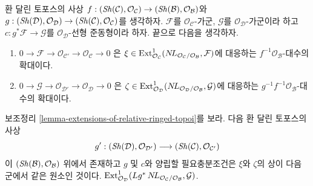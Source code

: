 \begin{lemma}
\label{lemma-extensions-of-relative-ringed-topoi-functorial}
환 달린 토포스의 사상
$f : (\mathop{\mathit{Sh}}\nolimits(\mathcal{C}), \mathcal{O}_\mathcal{C}) \to
(\mathop{\mathit{Sh}}\nolimits(\mathcal{B}), \mathcal{O}_\mathcal{B})$와
$g : (\mathop{\mathit{Sh}}\nolimits(\mathcal{D}), \mathcal{O}_\mathcal{D}) \to
(\mathop{\mathit{Sh}}\nolimits(\mathcal{C}), \mathcal{O}_\mathcal{C})$를 생각하자. $\mathcal{F}$를
$\mathcal{O}_\mathcal{C}$-가군, $\mathcal{G}$를
$\mathcal{O}_\mathcal{D}$-가군이라 하고
$c : g^*\mathcal{F} \to \mathcal{G}$를 $\mathcal{O}_\mathcal{D}$-선형
준동형이라 하자. 끝으로 다음을 생각하자.
\begin{enumerate}
\item[(a)]
$0 \to \mathcal{F} \to \mathcal{O}_{\mathcal{C}'} \to
\mathcal{O}_\mathcal{C} \to 0$
은
$\xi \in \mathop{\mathrm{Ext}}\nolimits^1_{\mathcal{O}_\mathcal{C}}(
\mathop{N\!L}\nolimits_{\mathcal{O}_\mathcal{C}/\mathcal{O}_\mathcal{B}}, \mathcal{F})$에
대응하는 $f^{-1}\mathcal{O}_\mathcal{B}$-대수의 확대이다.
\item[(b)]
$0 \to \mathcal{G} \to \mathcal{O}_{\mathcal{D}'} \to
\mathcal{O}_\mathcal{D} \to 0$
은
$\zeta \in \mathop{\mathrm{Ext}}\nolimits^1_{\mathcal{O}_\mathcal{D}}(
\mathop{N\!L}\nolimits_{\mathcal{O}_\mathcal{D}/\mathcal{O}_\mathcal{B}}, \mathcal{G})$에
대응하는 $g^{-1}f^{-1}\mathcal{O}_\mathcal{B}$-대수의 확대이다.
\end{enumerate}
보조정리 \ref{lemma-extensions-of-relative-ringed-topoi}를 보라. 다음
환 달린 토포스의 사상
$$
g' :
(\mathop{\mathit{Sh}}\nolimits(\mathcal{D}), \mathcal{O}_{\mathcal{D}'})
\longrightarrow
(\mathop{\mathit{Sh}}\nolimits(\mathcal{C}), \mathcal{O}_{\mathcal{C}'})
$$
이 $(\mathop{\mathit{Sh}}\nolimits(\mathcal{B}), \mathcal{O}_\mathcal{B})$ 위에서 존재하고
$g$ 및 $c$와 양립할 필요충분조건은 $\xi$와 $\zeta$의 상이 다음
군에서 같은 원소인 것이다.
$\mathop{\mathrm{Ext}}\nolimits^1_{\mathcal{O}_\mathcal{D}}(
Lg^*\mathop{N\!L}\nolimits_{\mathcal{O}_\mathcal{C}/\mathcal{O}_\mathcal{B}}, \mathcal{G})$.
\end{lemma}


